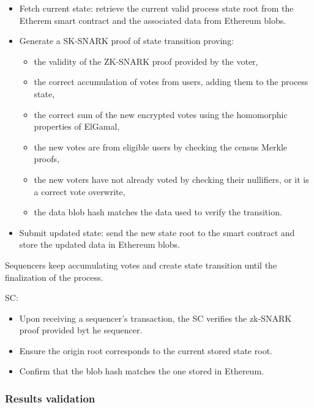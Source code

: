 \begin{itemize}
	\item Fetch current state: retrieve the current valid process state root from the Etherem smart contract and the associated data from Ethereum blobs.
	\item Generate a SK-SNARK proof of state transition proving:
		\begin{itemize}
			\item the validity of the ZK-SNARK proof provided by the voter,
			\item the correct accumulation of votes from users, adding them to the process state,
			\item the correct sum of the new encrypted votes using the homomorphic properties of ElGamal,
			\item the new votes are from eligible users by checking the census Merkle proofs,
			\item the new voters have not already voted by checking their nullifiers, or it is a correct vote overwrite,
			\item the data blob hash matches the data used to verify the transition.
		\end{itemize}
	\item Submit updated state: send the new state root to the smart contract and store the updated data in Ethereum blobs.
\end{itemize}

Sequencers keep accumulating votes and create state transition until the finalization of the process.


SC:

\begin{itemize}
	\item Upon receiving a sequencer's transaction, the SC verifies the zk-SNARK proof provided byt he sequencer.
	\item Ensure the origin root corresponds to the current stored state root.
	\item Confirm that the blob hash matches the one stored in Ethereum.
\end{itemize}

\subsubsection{Results validation}
\label{sec:vocdoni-protocol:validation}

